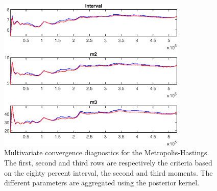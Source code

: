  
\begin{figure}[H]
\centering 
\includegraphics[width=0.8\textwidth]{BRS_growth_KPR/Output/BRS_growth_KPR_mdiag}
\caption{Multivariate convergence diagnostics for the Metropolis-Hastings.
The first, second and third rows are respectively the criteria based on
the eighty percent interval, the second and third moments. The different 
parameters are aggregated using the posterior kernel.}\label{Fig:MultivariateDiagnostics}
\end{figure}

